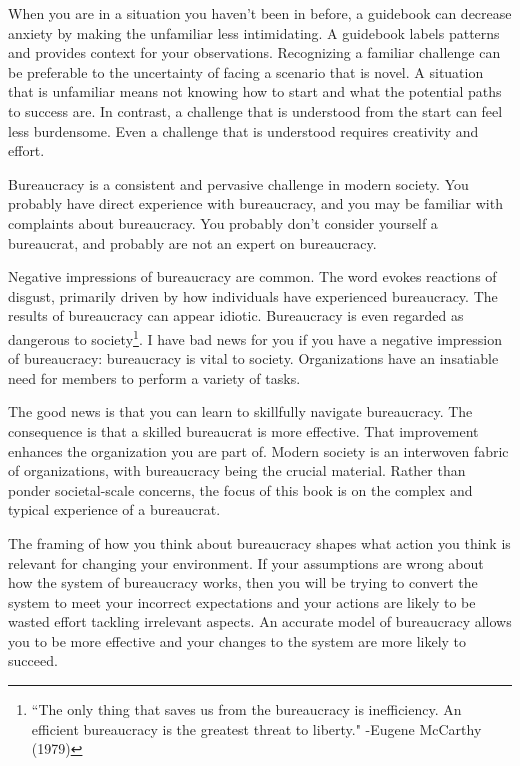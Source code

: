 
When you are in a situation you haven't been in before, a guidebook can decrease anxiety by making the unfamiliar less intimidating. 
A guidebook labels patterns and provides context for your observations. 
Recognizing a familiar challenge can be preferable to the uncertainty of facing a scenario that is novel. A situation that is unfamiliar means not knowing how to start and what the potential paths to success are. In contrast, a challenge that is understood from the start can feel less burdensome. Even a challenge that is understood requires creativity and effort.

Bureaucracy is a consistent and pervasive challenge in modern society. You probably have direct experience with bureaucracy, and you may be familiar with complaints about bureaucracy. You probably don't consider yourself a bureaucrat, and probably are not an expert on bureaucracy.


Negative impressions of bureaucracy are common. The word
evokes reactions of disgust, primarily driven by how individuals have experienced bureaucracy.
The results of bureaucracy can appear idiotic.
Bureaucracy is even regarded as dangerous to society\footnote{``The only thing that saves us from the bureaucracy is inefficiency. An efficient bureaucracy is the greatest threat to liberty." -Eugene McCarthy (1979)}.
I have bad news for you if you have a negative impression of bureaucracy: bureaucracy is vital to society. 
Organizations have an insatiable need for members to perform a variety of tasks.

The good news is that you can learn to skillfully navigate bureaucracy. The consequence is that a skilled bureaucrat is more effective. That improvement enhances the organization you are part of. Modern society is an interwoven fabric of organizations, with  bureaucracy being the crucial material.
Rather than ponder societal-scale concerns, the focus of this book is on the complex and typical experience of a bureaucrat. 


The framing of how you think about bureaucracy shapes what action you think is relevant for changing your environment. 
If your assumptions are wrong about how the system of bureaucracy works, then you will be trying to convert the system to meet your incorrect expectations and your actions are likely to be wasted effort tackling irrelevant aspects. 
An accurate model of bureaucracy allows you to be more effective and your changes to the system are more likely to succeed. 


